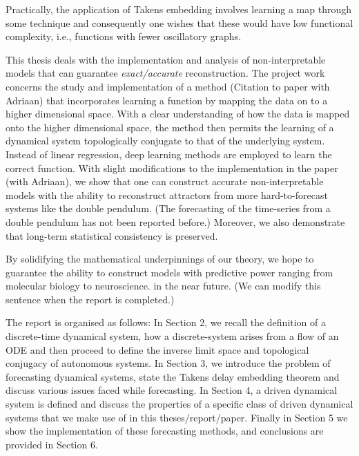 \documentclass[12 pt]{article}
\begin{document}
Practically, the application of Takens embedding involves learning a map through some technique and consequently one wishes that these would have low functional complexity\cite{manjunath2021universal}, i.e., functions with fewer oscillatory graphs.

This thesis deals with the implementation and analysis of non-interpretable models that can guarantee \emph{exact/accurate} reconstruction. The project work concerns the study and implementation of a method (Citation to paper with Adriaan) that incorporates learning a function by mapping the data on to a higher dimensional space. With a clear understanding of how the data is mapped onto the higher dimensional space, the method then permits the learning of a dynamical system topologically conjugate to that of the underlying system. Instead of linear regression, deep learning methods are employed to learn the correct function. With slight modifications to the implementation in the paper (with Adriaan), we show that one can construct accurate non-interpretable models with the ability to reconstruct attractors from more hard-to-forecast systems like the double pendulum. (The forecasting of the time-series from a double pendulum has not been reported before.) Moreover, we also demonstrate that long-term statistical consistency is preserved.

By solidifying the mathematical underpinnings of our theory, we hope to guarantee the ability to construct models with predictive power ranging from molecular biology to neuroscience. in the near future. (We can modify this sentence when the report is completed.)

The report is organised as follows: 
\newline In Section 2, we recall the definition of a discrete-time dynamical system, how a discrete-system arises from a flow of an ODE and then proceed to define the inverse limit space and topological conjugacy of autonomous systems. 
\newline In Section 3, we introduce the problem of forecasting dynamical systems, state the Takens delay embedding theorem and discuss various issues faced while forecasting. 
\newline In Section 4, a driven dynamical system is defined and discuss the properties of a specific class of driven dynamical systems that we make use of in this theses/report/paper. 
\newline Finally in Section 5 we show the implementation of these forecasting methods, and conclusions are provided in Section 6.
\end{document}
